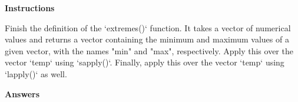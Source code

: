 \documentclass[]{article}
\newcommand{\hlstr}[1]{\textcolor[rgb]{0.251,0.627,0.251}{#1}}%
\newcommand{\hlstd}[1]{\textcolor[rgb]{0.251,0.251,0.251}{#1}}%
\newcommand{\hlkwc}[1]{\textcolor[rgb]{0.251,0.251,0.251}{#1}}%
\newenvironment{Shaded}{\begin{myshaded}}{\end{myshaded}}
\newcommand{\DataTypeTok}[1]{\hlkwc{#1}}
\newcommand{\StringTok}[1]{\hlstr{#1}}
\newcommand{\NormalTok}[1]{\hlstd{#1}}
\begin{document}
\textbf{Instructions}

\begin{Shaded}
\begin{Highlighting}[]
\OperatorTok{*}\StringTok{ }\NormalTok{Finish the definition of the }\StringTok{`}\DataTypeTok{extremes()}\StringTok{`}\NormalTok{ function. It takes a vector of numerical values and returns a vector containing the minimum and maximum values of a given vector, with the names }\StringTok{"min"}\NormalTok{ and }\StringTok{"max"}\NormalTok{, respectively.}
\OperatorTok{*}\StringTok{ }\NormalTok{Apply this }\NormalTok{ over the vector }\StringTok{`}\DataTypeTok{temp}\StringTok{`}\NormalTok{ using }\StringTok{`}\DataTypeTok{sapply()}\StringTok{`}\NormalTok{.}
\OperatorTok{*}\StringTok{ }\NormalTok{Finally, apply this }\NormalTok{ over the vector }\StringTok{`}\DataTypeTok{temp}\StringTok{`}\NormalTok{ using }\StringTok{`}\DataTypeTok{lapply()}\StringTok{`}\NormalTok{ as well.}
\end{Highlighting}
\end{Shaded}

\textbf{Answers}
\end{document}
